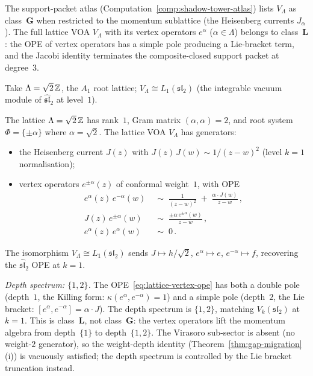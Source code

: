 The support-packet atlas
(Computation~\ref{comp:shadow-tower-atlas}) lists $V_\Lambda$
as class~$\mathbf{G}$ when restricted to the momentum
sublattice (the Heisenberg currents $J_\alpha$). The full
lattice VOA $V_\Lambda$ with its vertex operators
$e^\alpha$ ($\alpha \in \Lambda$) belongs to class~$\mathbf{L}$:
the OPE of vertex operators has a simple pole producing a
Lie-bracket term, and the Jacobi identity terminates the
composite-closed support packet at degree~$3$.

Take $\Lambda = \sqrt{2}\,\mathbb{Z}$, the $A_1$ root lattice; $V_\Lambda \cong L_1(\mathfrak{sl}_2)$ (the integrable vacuum module of $\widehat{\mathfrak{sl}}_2$ at level~$1$).

\begin{computation}%
\label{comp:lattice-voa-ordered-bar}%
%
%
%
The lattice $\Lambda = \sqrt{2}\,\mathbb{Z}$ has rank~$1$,
Gram matrix $(\alpha, \alpha) = 2$, and root system
$\Phi = \{\pm\alpha\}$ where $\alpha = \sqrt{2}$. The
lattice VOA $V_\Lambda$ has generators:
\begin{itemize}[nosep]
\item the Heisenberg current $J(z)$ with
 $J(z)\,J(w) \sim 1/(z-w)^2$
 (level $k = 1$ normalisation);
\item vertex operators $e^{\pm\alpha}(z)$ of
 conformal weight~$1$, with OPE
 \begin{align}
 e^\alpha(z)\, e^{-\alpha}(w)
 &\;\sim\;
 \frac{1}{(z-w)^2}
 \;+\;
 \frac{\alpha \cdot J(w)}{z-w}\,,
 \label{eq:lattice-vertex-ope}
 \\[3pt]
 J(z)\, e^{\pm\alpha}(w)
 &\;\sim\;
 \frac{\pm\alpha\, e^{\pm\alpha}(w)}{z-w}\,,
 \label{eq:lattice-current-vertex-ope}
 \\[3pt]
 e^{\alpha}(z)\, e^{\alpha}(w)
 &\;\sim\; 0\,.
 \label{eq:lattice-vertex-vertex-vanishing}
 \end{align}
\end{itemize}
The isomorphism $V_\Lambda \cong L_1(\mathfrak{sl}_2)$
sends $J \mapsto h/\sqrt{2}$,
$e^\alpha \mapsto e$, $e^{-\alpha} \mapsto f$,
recovering the $\widehat{\mathfrak{sl}}_2$ OPE at $k = 1$.

\smallskip
\noindent
\emph{Depth spectrum: $\{1,2\}$.}
The OPE~\eqref{eq:lattice-vertex-ope} has both a double pole
(depth~$1$, the Killing form: $\kappa(e^\alpha, e^{-\alpha}) = 1$)
and a simple pole (depth~$2$, the Lie bracket:
$[e^\alpha, e^{-\alpha}] = \alpha \cdot J$). The depth spectrum
is $\{1, 2\}$, matching $V_k(\mathfrak{sl}_2)$ at $k = 1$.
This is class~$\mathbf{L}$, not class~$\mathbf{G}$:
the vertex operators lift the momentum algebra from depth~$\{1\}$
to depth~$\{1,2\}$.
The Virasoro sub-sector is absent (no weight-$2$ generator), so the weight-depth identity (Theorem~\ref{thm:gap-migration}(i)) is vacuously satisfied; the depth spectrum is controlled by the Lie bracket truncation instead.


\end{computation}
